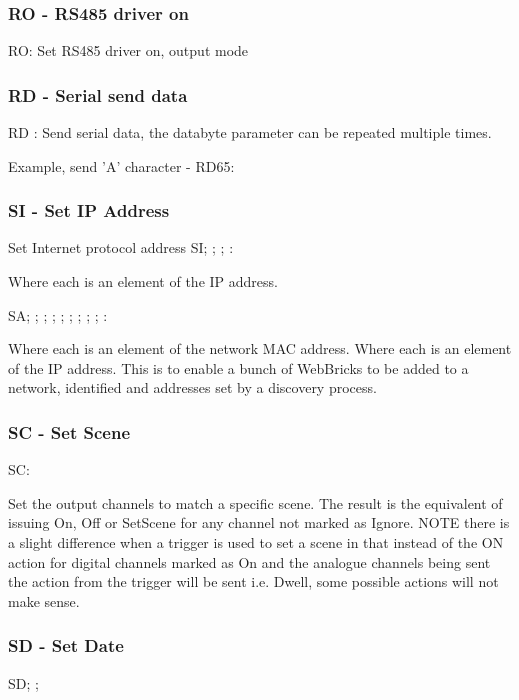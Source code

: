 \subsubsection{RO - RS485 driver on}
RO:
Set RS485 driver on, output mode

\subsubsection{RD - Serial send data}
RD :
Send serial data, the databyte parameter can be repeated multiple times.

Example, send 'A' character - RD65:  

\subsubsection{SI - Set IP Address}
Set Internet protocol address
SI; ; ; :

Where each  is an element of the IP address.

SA; ; ; ; ; ; ; ; ; :

Where each  is an element of the network MAC address.
Where each  is an element of the IP address.
This is to enable a bunch of WebBricks to be added to a network, identified and addresses set by a discovery process.

\subsubsection{SC - Set Scene}
SC:

Set the output channels to match a specific scene. The result is the equivalent of issuing On, Off or SetScene 
for any channel not marked as Ignore. NOTE there is a slight difference when a trigger is used to set a scene
in that instead of the ON action for digital channels marked as On and the analogue channels being sent 
the action from the trigger will be sent i.e. Dwell, some possible actions will not make sense.

\subsubsection{SD - Set Date}
SD; ;   

